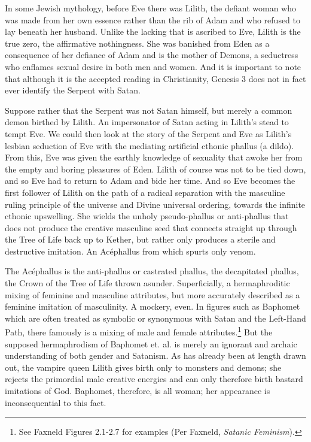 \documentclass[10pt, statementpaper, twoside, openright]{memoir}
\begin{document}
In some Jewish mythology, before Eve there was Lilith, the defiant woman who was made from her own essence rather than the rib of Adam and who refused to lay beneath her husband. Unlike the lacking that is ascribed to Eve, Lilith is the true zero, the affirmative nothingness. She was banished from Eden as a consequence of her defiance of Adam and is the mother of Demons, a seductress who enflames sexual desire in both men and women. And it is important to note that although it is the accepted reading in Christianity, Genesis 3 does not in fact ever identify the Serpent with Satan.

Suppose rather that the Serpent was not Satan himself, but merely a common demon birthed by Lilith. An impersonator of Satan acting in Lilith's stead to tempt Eve. We could then look at the story of the Serpent and Eve as Lilith's lesbian seduction of Eve with the mediating artificial cthonic phallus (a dildo). From this, Eve was given the earthly knowledge of sexuality that awoke her from the empty and boring pleasures of Eden. Lilith of course was not to be tied down, and so Eve had to return to Adam and bide her time. And so Eve becomes the first follower of Lilith on the path of a radical separation with the masculine ruling principle of the universe and Divine universal ordering, towards the infinite cthonic upswelling. She wields the unholy pseudo-phallus or anti-phallus that does not produce the creative masculine seed that connects straight up through the Tree of Life back up to Kether, but rather only produces a sterile and destructive imitation. An Acéphallus from which spurts only venom.

The Acéphallus is the anti-phallus or castrated phallus, the decapitated phallus, the Crown of the Tree of Life thrown asunder. Superficially, a hermaphroditic mixing of feminine and masculine attributes, but more accurately described as a feminine imitation of masculinity. A mockery, even. In figures such as Baphomet which are often treated as symbolic or synonymous with Satan and the Left-Hand Path, there famously is a mixing of male and female attributes.\footnote{See Faxneld Figures 2.1-2.7 for examples (Per Faxneld, \textit{Satanic Feminism}).} But the supposed hermaphrodism of Baphomet et. al. is merely an ignorant and archaic understanding of both gender and Satanism. As has already been at length drawn out, the vampire queen Lilith gives birth only to monsters and demons; she rejects the primordial male creative energies and can only therefore birth bastard imitations of God. Baphomet, therefore, is all woman; her appearance is inconsequential to this fact.
\end{document}
